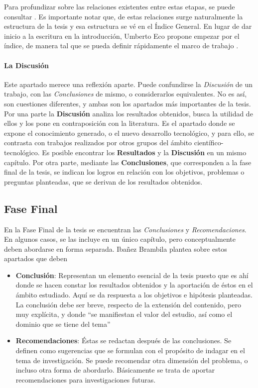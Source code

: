 Para profundizar sobre las relaciones existentes entre estas etapas, se puede consultar \cite{melendrez2006como}. Es importante notar que, de estas relaciones surge naturalmente la estructura de la tesis y esa estructura se vé en el Índice General. En lugar de dar inicio a la escritura en la introducción, Umberto Eco propone empezar por el índice, de manera tal que se pueda definir rápidamente el marco de trabajo \cite{eco2015write}.

\paragraph{La Discusión}
Este apartado merece una reflexión aparte. Puede  confundirse la \textit{Discusión} de un trabajo, con las \textit{Conclusiones} de mismo, o considerarlos equivalentes. No es así, son cuestiones diferentes, y  ambas son los apartados más importantes de la tesis. Por una parte la \textbf{Discusión} analiza los resultados obtenidos, busca la utilidad de ellos y los pone en contraposición con la literatura. Es el apartado donde se expone el  conocimiento generado, o el nuevo desarrollo tecnológico, y para ello, se contrasta con trabajos realizados por otros grupos del ámbito científico-tecnológico. Es posible encontrar los \textbf{Resultados} y la \textbf{Discusión} en un mismo capítulo.
Por otra parte, mediante las \textbf{Conclusiones}, que corresponden a la fase final de la tesis, se indican los logros en relación con los objetivos, problemas o preguntas planteadas, que se derivan de los resultados obtenidos.

\subsection{Fase Final}

En la Fase Final de la tesis se encuentran las \textit{Conclusiones} y \textit{Recomendaciones}. En algunos casos, se las incluye en un único capítulo, pero conceptualmente deben abordarse en forma separada. Ibañez Brambila \cite{brambila2000manual} plantea sobre estos apartados que deben 
\begin{itemize}
	\item \textbf{Conclusión}: Representan un elemento esencial de la tesis puesto que es ahí donde se hacen constar los resultados obtenidos y la aportación de éstos en el ámbito estudiado. Aquí se da respuesta a los objetivos e hipótesis planteadas. La conclusión debe ser breve, respecto de la extensión del contenido, pero muy explícita, y donde “se manifiestan el valor del estudio, así como el dominio que se tiene del tema”
	\item \textbf{Recomendaciones}: Éstas se redactan después de las conclusiones. Se definen como sugerencias que se formulan con el propósito de indagar en el tema de investigación. Se puede recomendar otra dimensión del problema, o incluso otra forma  de  abordarlo.  Básicamente  se  trata  de  aportar  recomendaciones  para investigaciones futuras.
\end{itemize}

